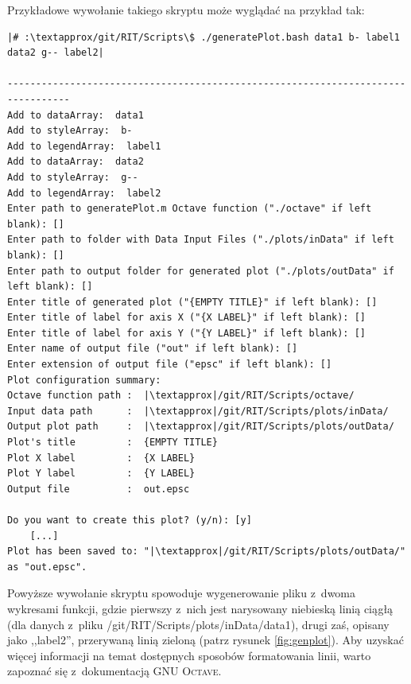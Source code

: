 
Przykładowe wywołanie takiego skryptu może wyglądać na przykład tak:

\begin{verbatim}
|# :\textapprox/git/RIT/Scripts\$ ./generatePlot.bash data1 b- label1 data2 g-- label2|

---------------------------------------------------------------------------------
Add to dataArray:  data1
Add to styleArray:  b-
Add to legendArray:  label1
Add to dataArray:  data2
Add to styleArray:  g--
Add to legendArray:  label2
Enter path to generatePlot.m Octave function ("./octave" if left blank): []
Enter path to folder with Data Input Files ("./plots/inData" if left blank): [] 
Enter path to output folder for generated plot ("./plots/outData" if left blank): []
Enter title of generated plot ("{EMPTY TITLE}" if left blank): []
Enter title of label for axis X ("{X LABEL}" if left blank): []
Enter title of label for axis Y ("{Y LABEL}" if left blank): []
Enter name of output file ("out" if left blank): []
Enter extension of output file ("epsc" if left blank): []
Plot configuration summary: 
Octave function path :	|\textapprox|/git/RIT/Scripts/octave/
Input data path      :	|\textapprox|/git/RIT/Scripts/plots/inData/
Output plot path     :	|\textapprox|/git/RIT/Scripts/plots/outData/
Plot's title         :	{EMPTY TITLE}
Plot X label         :	{X LABEL}
Plot Y label         :	{Y LABEL}
Output file          :	out.epsc

Do you want to create this plot? (y/n): [y]
	[...]
Plot has been saved to: "|\textapprox|/git/RIT/Scripts/plots/outData/" as "out.epsc".
\end{verbatim}

Powyższe wywołanie skryptu spowoduje wygenerowanie pliku z~dwoma wykresami funkcji, gdzie pierwszy z~nich jest narysowany niebieską linią ciągłą (dla danych z~pliku \textsf{\textapprox/git/RIT/Scripts/plots/inData/data1}), drugi zaś, opisany jako ,,label2'',  przerywaną linią zieloną (patrz rysunek \ref{fig:genplot}).
Aby uzyskać więcej informacji na temat dostępnych sposobów formatowania linii, warto zapoznać się z~dokumentacją \textsc{GNU Octave}.

